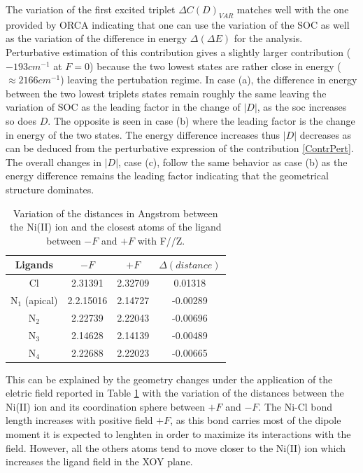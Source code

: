 \documentclass[10pt]{report}
\numberwithin{equation}{section}
\begin{document}
The variation of the first excited triplet $\Delta C(D)_{VAR}$ matches well with the one provided by ORCA indicating that one can use the variation of the SOC as well as the variation of the difference in energy $\Delta (\Delta E)$ for the analysis.
Perturbative estimation of this contribution gives a slightly larger contribution ($-193 cm^{-1}$ at $F=0$) because the two lowest states are rather close in energy ($\approx 2166 cm^{-1}$) leaving the pertubation regime.
In case (a), the difference in energy between the two lowest triplets states remain roughly the same leaving the variation of SOC as the leading factor in the change of $|D|$, as the soc increases so does $D$.
The opposite is seen in case (b) where the leading factor is the change in energy of the two states. 
The energy difference increases thus $|D|$ decreases as can be deduced from the perturbative expression of the contribution \ref{ContrPert}.
The overall changes in $|D|$, case (c), follow the same behavior as case (b) as the energy difference remains the leading factor indicating that the geometrical structure dominates.
\begin{table}[h!]
    \centering
    \begin{tabular}{| c | c| c | c |}
        \hline
        Ligands & $-F$ & $+F$ &$\Delta(distance)$\\
        \hline
        Cl & 2.31391& 2.32709&0.01318 \\
        N$_1$ (apical) & 2.2.15016  & 2.14727 &-0.00289\\
        N$_2$ & 2.22739 & 2.22043&-0.00696 \\
        N$_3$ & 2.14628& 2.14139&-0.00489 \\
        N$_4$ & 2.22688 & 2.22023 &-0.00665\\
        \hline
    \end{tabular}
    \caption{Variation of the distances in Angstrom between the Ni(II) ion and the closest atoms of the ligand between $-F$ and $+F$ with F//Z.}
    \label{tab:DistanceZ}
\end{table}
This can be explained by the geometry changes under the application of the eletric field reported in Table \ref{tab:DistanceZ} with the variation of the distances between the Ni(II) ion and its coordination sphere between $+F$ and $-F$.
The Ni-Cl bond length increases with positive field $+F$, as this bond carries most of the dipole moment it is expected to lenghten in order to maximize its interactions with the field. 
However, all the others atoms tend to move closer to the Ni(II) ion which increases the ligand field in the XOY plane. 
\end{document}
